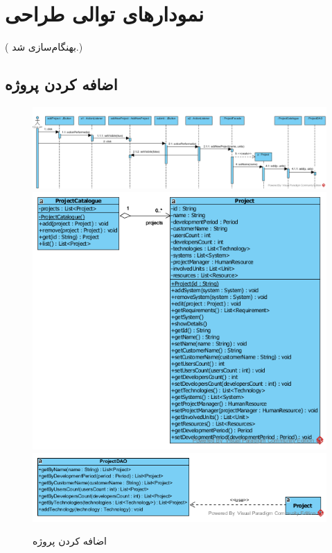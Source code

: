 \chapter{نمودارهای توالی طراحی}
({\color{red}  بهنگام‌سازی شد.})\\

\newpage
\begin{landscape}
\section{اضافه کردن پروژه}
\begin{figure}[H]
	\centering
	\includegraphics[scale=0.6]{img/sequence-design/AddProjectToOrganization}	
	\includegraphics[scale=0.6]{img/sequence-design/AddProjectToOrganizationC}
	\includegraphics[scale=0.6]{img/sequence-design/AddProjectToOrganizationD}
	\caption{اضافه کردن پروژه}
\end{figure}
\end{landscape}


